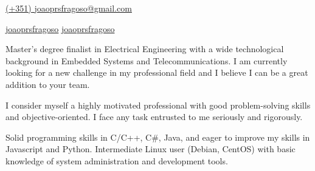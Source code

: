 \documentclass[12pt, a4paper]{cv}
\begin{document}
\begin{center}
\begin{minipage}{0.09\linewidth}
	\photo{0.9cm}
\end{minipage}\hfil
\begin{minipage}{0.46\linewidth}
\end{minipage}
\end{center}
\vspace{-4mm}
\begin{center}
\begin{minipage}{0.35\linewidth}
	\mobile \space\space \href{callto:+351924429083}{(+351) } \newline
	\mail \space \href{mailto:joaoprsfragoso@gmail.com}{joaoprsfragoso@gmail.com}
\end{minipage}\hfil
\begin{minipage}{0.2\linewidth}
	\linkedin \space\space \href{https://www.linkedin.com/in/joaoprsfragoso/}{joaoprsfragoso} \newline
	\skype \space\space \href{skype://joaoprsfragoso}{joaoprsfragoso}
\end{minipage}
\end{center}
\vfill
{}%
\aboutme
{
	Master's degree finalist in Electrical Engineering with a wide technological background in Embedded Systems and Telecommunications. I am currently looking for a new challenge in my professional field and I believe I can be a great addition to your team.

	I consider myself a highly motivated professional with good problem-solving skills and objective-oriented. I face any task entrusted to me seriously and rigorously.

	Solid programming skills in C/C++, C\#, Java, and eager to improve my skills in Javascript and Python. Intermediate Linux user (Debian, CentOS) with basic knowledge of system administration and development tools.
}
\vspace{3mm}

\begin{minipage}{0.8\linewidth}
	 \newline
\end{minipage}\hfil
\begin{minipage}{0.2\linewidth}
	\begin{flushright}
	\end{flushright}
\end{minipage}\\
\end{document}
